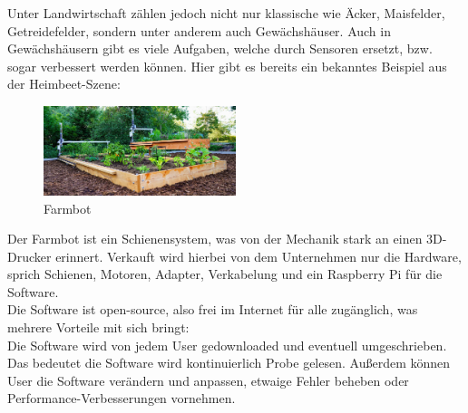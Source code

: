 Unter Landwirtschaft zählen jedoch nicht nur klassische wie Äcker, Maisfelder, Getreidefelder, sondern unter anderem auch Gewächshäuser. Auch in Gewächshäusern gibt es viele Aufgaben, welche durch Sensoren ersetzt, bzw. sogar verbessert werden können.
Hier gibt es bereits ein bekanntes Beispiel aus der Heimbeet-Szene:\\

\begin{figure}[h]
	\centering
	\includegraphics[width=0.5\textwidth]{bilder/farmbot.png}
	\caption[Farmbot]{Farmbot}
	\label{fig:farmbot}
\end{figure}

Der Farmbot ist ein Schienensystem, was von der Mechanik stark an einen 3D-Drucker erinnert. Verkauft wird hierbei von dem Unternehmen nur die Hardware, sprich Schienen, Motoren, Adapter, Verkabelung und ein Raspberry Pi für die Software.\\
Die Software ist open-source, also frei im Internet für alle zugänglich, was mehrere Vorteile mit sich bringt:\\
Die Software wird von jedem User gedownloaded und eventuell umgeschrieben. Das bedeutet die Software wird kontinuierlich Probe gelesen. Außerdem können User die Software verändern und anpassen, etwaige Fehler beheben oder Performance-Verbesserungen vornehmen.